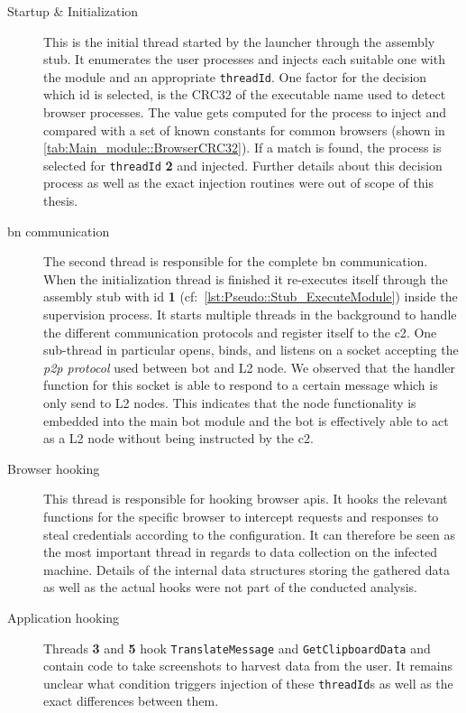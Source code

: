 \begin{description}
    \item[Startup \& Initialization] This is the initial thread started by the launcher through the assembly stub.
    It enumerates the user processes and injects each suitable one with the module and an appropriate \lstinline|threadId|.
    One factor for the decision which id is selected, is the CRC32 of the executable name used to detect browser processes.
    The value gets computed for the process to inject and compared with a set of known constants for common browsers (shown in \autoref{tab:Main_module::BrowserCRC32}).
    If a match is found, the process is selected for \lstinline|threadId| \textbf{2} and injected.
    Further details about this decision process as well as the exact injection routines were out of scope of this thesis.
    \item[\Gls{bn} communication] The second thread is responsible for the complete \gls{bn} communication.
    When the initialization thread is finished it re-executes itself through the assembly stub with id \textbf{1} (cf:~\autoref{lst:Pseudo::Stub_ExecuteModule}) inside the supervision process.
    It starts multiple threads in the background to handle the different communication protocols and register itself to the \gls{c2}.
    One sub-thread in particular opens, binds, and listens on a socket accepting the \emph{\gls{p2p} protocol} used between bot and L2 node.
    We observed that the handler function for this socket is able to respond to a certain message which is only send to L2 nodes.
    This indicates that the node functionality is embedded into the main bot module and the bot is effectively able to act as a L2 node without being instructed by the \gls{c2}.
    \item[Browser hooking] This thread is responsible for hooking browser \glspl{api}.
    It hooks the relevant functions for the specific browser to intercept requests and responses to steal credentials according to the configuration.
    It can therefore be seen as the most important thread in regards to data collection on the infected machine.
    Details of the internal data structures storing the gathered data as well as the actual hooks were not part of the conducted analysis.
    \item[Application hooking] Threads \textbf{3} and \textbf{5} hook \lstinline|TranslateMessage| and \lstinline|GetClipboardData| and contain code to take screenshots to harvest data from the user.
    It remains unclear what condition triggers injection of these \lstinline|threadId|s as well as the exact differences between them.

\end{description}
